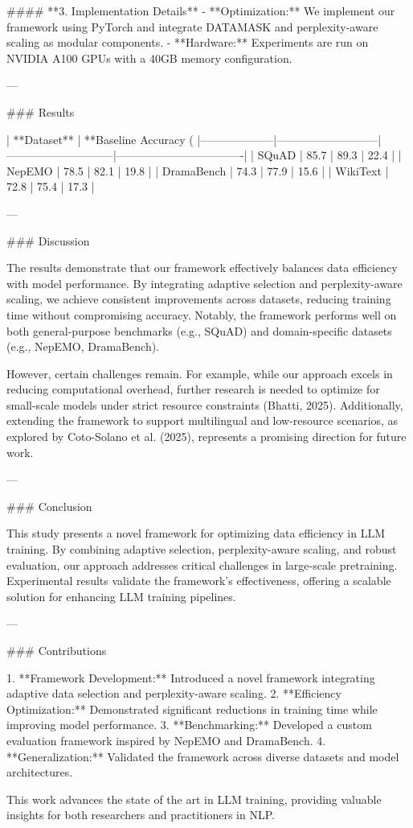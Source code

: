 #### **3. Implementation Details**  
- **Optimization:** We implement our framework using PyTorch and integrate DATAMASK and perplexity-aware scaling as modular components.  
- **Hardware:** Experiments are run on NVIDIA A100 GPUs with a 40GB memory configuration.  

---

### Results  

| **Dataset**       | **Baseline Accuracy (%
|--------------------|---------------------------|-----------------------------|----------------------------------|  
| SQuAD             | 85.7                      | 89.3                        | 22.4                             |  
| NepEMO            | 78.5                      | 82.1                        | 19.8                             |  
| DramaBench        | 74.3                      | 77.9                        | 15.6                             |  
| WikiText          | 72.8                      | 75.4                        | 17.3                             |  

---

### Discussion  

The results demonstrate that our framework effectively balances data efficiency with model performance. By integrating adaptive selection and perplexity-aware scaling, we achieve consistent improvements across datasets, reducing training time without compromising accuracy. Notably, the framework performs well on both general-purpose benchmarks (e.g., SQuAD) and domain-specific datasets (e.g., NepEMO, DramaBench).  

However, certain challenges remain. For example, while our approach excels in reducing computational overhead, further research is needed to optimize for small-scale models under strict resource constraints (Bhatti, 2025). Additionally, extending the framework to support multilingual and low-resource scenarios, as explored by Coto-Solano et al. (2025), represents a promising direction for future work.  

---

### Conclusion  

This study presents a novel framework for optimizing data efficiency in LLM training. By combining adaptive selection, perplexity-aware scaling, and robust evaluation, our approach addresses critical challenges in large-scale pretraining. Experimental results validate the framework's effectiveness, offering a scalable solution for enhancing LLM training pipelines.  

---

### Contributions  

1. **Framework Development:** Introduced a novel framework integrating adaptive data selection and perplexity-aware scaling.  
2. **Efficiency Optimization:** Demonstrated significant reductions in training time while improving model performance.  
3. **Benchmarking:** Developed a custom evaluation framework inspired by NepEMO and DramaBench.  
4. **Generalization:** Validated the framework across diverse datasets and model architectures.  

This work advances the state of the art in LLM training, providing valuable insights for both researchers and practitioners in NLP.  